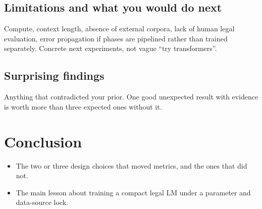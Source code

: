 \documentclass[11pt, oneside]{article}
\begin{document}
\subsection{Limitations and what you would do next}
Compute, context length, absence of external corpora, lack of human legal evaluation, error propagation if phases are pipelined rather than trained separately. Concrete next experiments, not vague ``try transformers''.
\subsection{Surprising findings}
Anything that contradicted your prior. One good unexpected result with evidence is worth more than three expected ones without it.
\section{Conclusion}
\begin{itemize}[leftmargin=*]
    \item The two or three design choices that moved metrics, and the ones that did not.
    \item The main lesson about training a compact legal LM under a parameter and data-source lock.
\end{itemize}
\end{document}
